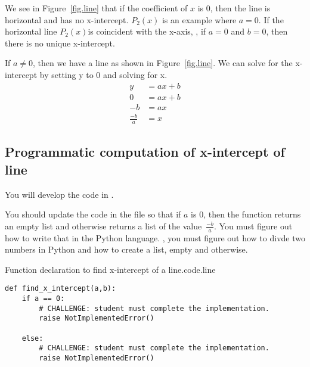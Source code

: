 We see in Figure~\ref{fig.line} that if the coefficient of $x$ is 0, then the
line is horizontal and has no x-intercept. $P_2(x)$ is an example where $a=0$.
If the horizontal line $P_2(x)$is coincident
with the x-axis, \ie, if $a=0$ and $b=0$, then there is no unique x-intercept.





If $a\neq 0$,  then we have a line as shown in Figure~\ref{fig.line}.  We can
solve for the x-intercept by setting y to 0 and solving for x.
\begin{align*}
  y &= a x + b\\
  0 &= a x + b\\
  -b &= a x\\
  \frac{-b}{a} &= x
\end{align*}



\subsection{Programmatic computation of x-intercept of line}

You will develop the code in .

You should update the code in the file  so that if
$a$ is 0, then the function returns an empty list and otherwise
returns a list of the value~$\frac{-b}{a}$.  You must figure out how
to write that in the Python language.  \Ie, you must figure out how to
divde two numbers in Python and how to create a list, empty and
otherwise.


\begin{listing}{Function declaration to find x-intercept of a line.}{code.line}
\begin{minipage}[c]{0.95\textwidth}\begin{lstlisting}
def find_x_intercept(a,b):
    if a == 0:
        # CHALLENGE: student must complete the implementation.
        raise NotImplementedError()

    else:
        # CHALLENGE: student must complete the implementation.
        raise NotImplementedError()
\end{lstlisting}\end{minipage}\end{listing}


